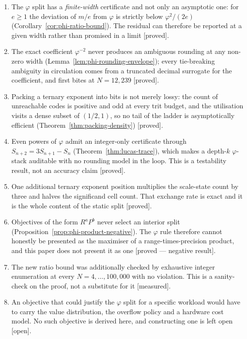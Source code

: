 \documentclass[11pt]{article}
\theoremstyle{definition}
\begin{document}
\begin{enumerate}
\item The $\varphi$ split has a \emph{finite-width} certificate and not only an
asymptotic one: for $e\geq1$ the deviation of $m/e$ from $\varphi$ is strictly
below $\varphi^{2}/(2e)$ (Corollary~\ref{cor:phi-ratio-bound}). The residual can
therefore be reported at a given width rather than promised in a limit
[proved].

\item The exact coefficient $\varphi^{-2}$ never produces an ambiguous rounding at
any non-zero width (Lemma~\ref{lem:phi-rounding-envelope}); every tie-breaking
ambiguity in circulation comes from a truncated decimal surrogate for the
coefficient, and first bites at $N=12{,}239$ [proved].

\item Packing a ternary exponent into bits is not merely lossy: the count of
unreachable codes is positive and odd at every trit budget, and the utilisation
visits a dense subset of $(1/2,1)$, so no tail of the ladder is asymptotically
efficient (Theorem~\ref{thm:packing-density}) [proved].

\item Even powers of $\varphi$ admit an integer-only certificate through
$S_{n+2}=3S_{n+1}-S_n$ (Theorem~\ref{thm:lucas-trace}), which makes a depth-$k$
$\varphi$-stack auditable with no rounding model in the loop. This is a testability
result, not an accuracy claim [proved].

\item One additional ternary exponent position multiplies the scale-state count by
three and halves the significand cell count. That exchange rate is exact and it is
the whole content of the static split [proved].

\item Objectives of the form $R^{a}P^{b}$ never select an interior split
(Proposition~\ref{prop:phi-product-negative}). The $\varphi$ rule therefore cannot
honestly be presented as the maximiser of a range-times-precision product, and
this paper does not present it as one [proved --- negative result].

\item The new ratio bound was additionally checked by exhaustive integer
enumeration at every $N=4,\dots,100{,}000$ with no violation. This is a
sanity-check on the proof, not a substitute for it [measured].

\item An objective that could justify the $\varphi$ split for a specific workload
would have to carry the value distribution, the overflow policy and a hardware
cost model. No such objective is derived here, and constructing one is left open
[open].
\end{enumerate}
\end{document}
